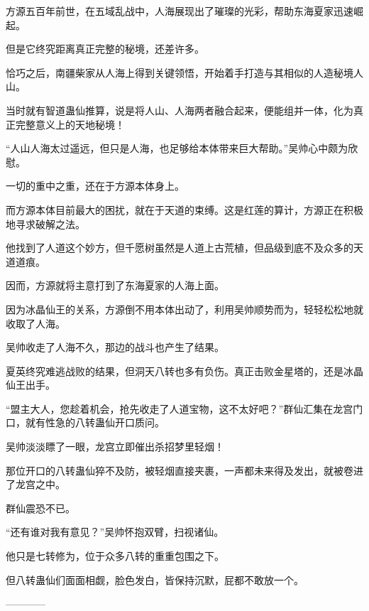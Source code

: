 \begin{this_body}
方源五百年前世，在五域乱战中，人海展现出了璀璨的光彩，帮助东海夏家迅速崛起。

但是它终究距离真正完整的秘境，还差许多。

恰巧之后，南疆柴家从人海上得到关键领悟，开始着手打造与其相似的人造秘境人山。

当时就有智道蛊仙推算，说是将人山、人海两者融合起来，便能组并一体，化为真正完整意义上的天地秘境！

“人山人海太过遥远，但只是人海，也足够给本体带来巨大帮助。”吴帅心中颇为欣慰。

一切的重中之重，还在于方源本体身上。

而方源本体目前最大的困扰，就在于天道的束缚。这是红莲的算计，方源正在积极地寻求破解之法。

他找到了人道这个妙方，但千愿树虽然是人道上古荒植，但品级到底不及众多的天道道痕。

因而，方源就将主意打到了东海夏家的人海上面。

因为冰晶仙王的关系，方源倒不用本体出动了，利用吴帅顺势而为，轻轻松松地就收取了人海。

吴帅收走了人海不久，那边的战斗也产生了结果。

夏英终究难逃战败的结果，但洞天八转也多有负伤。真正击败金星塔的，还是冰晶仙王出手。

“盟主大人，您趁着机会，抢先收走了人道宝物，这不太好吧？”群仙汇集在龙宫门口，就有性急的八转蛊仙开口质问。

吴帅淡淡瞟了一眼，龙宫立即催出杀招梦里轻烟！

那位开口的八转蛊仙猝不及防，被轻烟直接夹裹，一声都未来得及发出，就被卷进了龙宫之中。

群仙震恐不已。

“还有谁对我有意见？”吴帅怀抱双臂，扫视诸仙。

他只是七转修为，位于众多八转的重重包围之下。

但八转蛊仙们面面相觑，脸色发白，皆保持沉默，屁都不敢放一个。

------------

\end{this_body}

